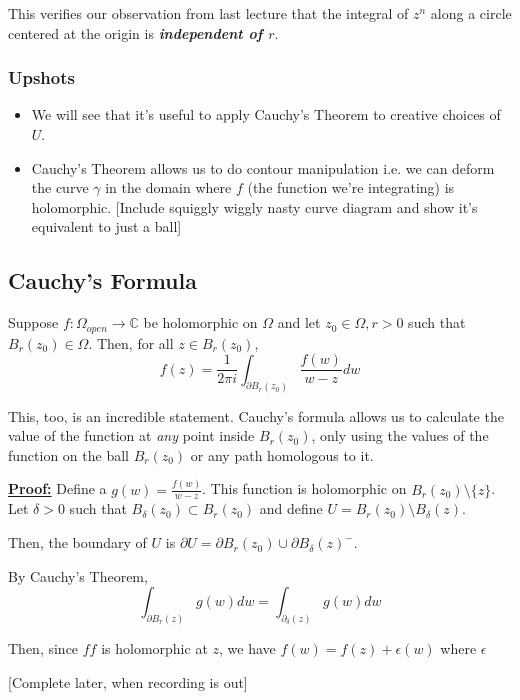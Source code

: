 \documentclass{article}
\newcommand{\C}{\mathbb{C}}
\begin{document}
\vskip 0.5cm
This verifies our observation from last lecture that the integral of $z^n$ along a circle centered at the origin is \emph{\textbf{independent of $r$}}.

\vskip 0.5cm
\subsubsection*{Upshots}
\begin{itemize}
  \item We will see that it's useful to apply Cauchy's Theorem to creative choices of $U$.
  \item Cauchy's Theorem allows us to do contour manipulation i.e. we can deform the curve $\gamma$ in the domain where $f$ (the function we're integrating) is holomorphic.
  [Include squiggly wiggly nasty curve diagram and show it's equivalent to just a ball]
\end{itemize}


\vskip 0.5cm
\subsection{Cauchy's Formula}

\begin{mathdefinitionbox}{}
  Suppose $f : \Omega_{open} \rightarrow \C$ be holomorphic on $\Omega$ and let $z_0 \in \Omega, r > 0$ such that $B_r(z_0) \in \Omega$. Then, for all $z \in B_r(z_0)$, 
  \[ f(z) = \frac{1}{2\pi i} \int_{\partial B_r(z_0)}  \frac{f(w)}{w - z} dw  \] 
\end{mathdefinitionbox}

\vskip 0.5cm
This, too, is an incredible statement. Cauchy's formula allows us to calculate the value of the function at \emph{any} point inside $B_r(z_0)$, only using the values of the function on the ball $B_r(z_0)$ or any path homologous to it.

\vskip 0.5cm
\begin{dottedbox}
  \underline{\textbf{Proof:}} Define a $g(w) = \frac{f(w)}{w -  z}$. This function is holomorphic on $B_r(z_0) \setminus \{z\}$. Let $\delta > 0$ such that $B_{\delta}(z_0) \subset B_r(z_0)$ and define $U = B_r(z_0) \setminus B_{\delta}(z)$.

  \vskip 0.5cm
  Then, the boundary of $U$ is $\partial U = \partial B_{r}(z_0) \cup \partial B_{\delta} (z)^{-}$.

  \vskip 0.5cm
  By Cauchy's Theorem, 
  \[ \int_{\partial B_r(z)} g(w) dw = \int_{\partial_{\delta}(z)} g(w) dw \]

  Then, since $ff$ is holomorphic at $z$, we have $f(w) = f(z) + \epsilon(w)$ where $\epsilon$

  [Complete later, when recording is out]
\end{dottedbox}
\end{document}
